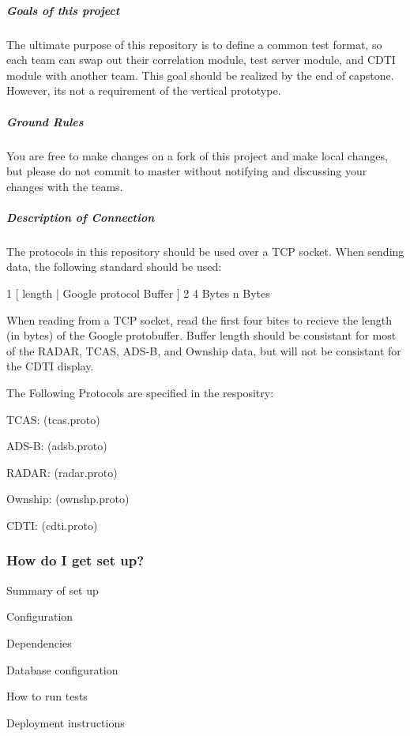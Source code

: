 \subparagraph*{Goals of this project}

The ultimate purpose of this repository is to define a common test format, so each team can swap out their correlation module, test server module, and C\+D\+TI module with another team. This goal should be realized by the end of capstone. However, it\textquotesingle{}s not a requirement of the vertical prototype.

\subparagraph*{Ground Rules}

You are free to make changes on a fork of this project and make local changes, but please do not commit to master without notifying and discussing your changes with the teams.

\subparagraph*{Description of Connection}

The protocols in this repository should be used over a T\+CP socket. When sending data, the following standard should be used\+:


\begin{DoxyCode}
1 [ length | Google protocol Buffer ]
2   4 Bytes       n Bytes
\end{DoxyCode}


When reading from a T\+CP socket, read the first four bites to recieve the length (in bytes) of the Google protobuffer. Buffer length should be consistant for most of the R\+A\+D\+AR, T\+C\+AS, A\+D\+S-\/B, and Ownship data, but will not be consistant for the C\+D\+TI display.

The Following Protocols are specified in the respositry\+:
\begin{DoxyItemize}
\item T\+C\+AS\+: (tcas.\+proto)
\item A\+D\+S-\/B\+: (adsb.\+proto)
\item R\+A\+D\+AR\+: (radar.\+proto)
\item Ownship\+: (ownshp.\+proto)
\item C\+D\+TI\+: (cdti.\+proto)
\end{DoxyItemize}

\subsubsection*{How do I get set up?}


\begin{DoxyItemize}
\item Summary of set up
\item Configuration
\item Dependencies
\item Database configuration
\item How to run tests
\item Deployment instructions
\end{DoxyItemize}

